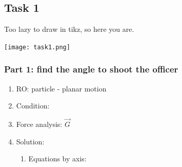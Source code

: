\subsection*{Task 1}

Too lazy to draw in tikz, so here you are.

\texttt{[image: task1.png]}

\subsubsection*{Part 1: find the angle to shoot the officer}

\begin{enumerate}
    \item RO: particle - planar motion
    \item Condition:
          \begin{center}
          \end{center}
    \item Force analysis:
          $\vec{G}$
    \item Solution:
          \begin{enumerate}
              \item Equations by axis:
                    \begin{align}

\end{align}
\end{enumerate}
\end{enumerate}
